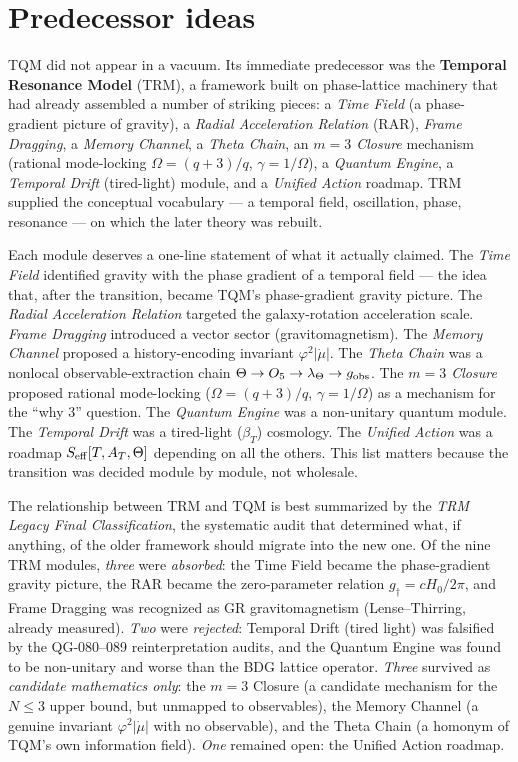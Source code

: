 \documentclass[10pt,twoside,openany]{book}
\begin{document}
\section{Predecessor ideas}

TQM did not appear in a vacuum. Its immediate predecessor was the \textbf{Temporal
Resonance Model} (TRM), a framework built on phase-lattice machinery that had already
assembled a number of striking pieces: a \emph{Time Field} (a phase-gradient picture of
gravity), a \emph{Radial Acceleration Relation} (RAR), \emph{Frame Dragging},
a \emph{Memory Channel}, a \emph{Theta Chain}, an \emph{$m=3$ Closure} mechanism (rational
mode-locking $\Omega=(q+3)/q$, $\gamma=1/\Omega$), a \emph{Quantum Engine}, a
\emph{Temporal Drift} (tired-light) module, and a \emph{Unified Action} roadmap. TRM
supplied the conceptual vocabulary --- a temporal field, oscillation, phase, resonance ---
on which the later theory was rebuilt.

Each module deserves a one-line statement of what it actually claimed. The \emph{Time
Field} identified gravity with the phase gradient of a temporal field --- the idea that,
after the transition, became TQM's phase-gradient gravity picture. The \emph{Radial
Acceleration Relation} targeted the galaxy-rotation acceleration scale. \emph{Frame
Dragging} introduced a vector sector (gravitomagnetism). The \emph{Memory Channel} proposed
a history-encoding invariant $\varphi^2|\dot\mu|$. The \emph{Theta Chain} was a nonlocal
observable-extraction chain $\Theta\to O_5\to\lambda_\Theta\to g_{\rm obs}$. The \emph{$m=3$
Closure} proposed rational mode-locking ($\Omega=(q+3)/q$, $\gamma=1/\Omega$) as a mechanism
for the ``why 3'' question. The \emph{Quantum Engine} was a non-unitary quantum module. The
\emph{Temporal Drift} was a tired-light ($\beta_T$) cosmology. The \emph{Unified Action}
was a roadmap $S_{\rm eff}[T,A_T,\Theta]$ depending on all the others. This list matters
because the transition was decided module by module, not wholesale.

The relationship between TRM and TQM is best summarized by the \emph{TRM Legacy Final
Classification}, the systematic audit that determined what, if anything, of the older
framework should migrate into the new one. Of the nine TRM modules, \emph{three} were
\emph{absorbed}: the Time Field became the phase-gradient gravity picture, the RAR became
the zero-parameter relation $g_\dagger = cH_0/2\pi$, and Frame Dragging was recognized as
GR gravitomagnetism (Lense--Thirring, already measured). \emph{Two} were \emph{rejected}:
Temporal Drift (tired light) was falsified by the QG-080--089 reinterpretation audits, and
the Quantum Engine was found to be non-unitary and worse than the BDG lattice operator.
\emph{Three} survived as \emph{candidate mathematics only}: the $m=3$ Closure (a candidate
mechanism for the $N\le3$ upper bound, but unmapped to observables), the Memory Channel
(a genuine invariant $\varphi^2|\dot\mu|$ with no observable), and the Theta Chain (a
homonym of TQM's own information field). \emph{One} remained open: the Unified Action
roadmap.
\end{document}
